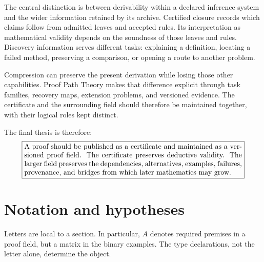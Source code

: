 \documentclass[11pt,oneside]{article}
\theoremstyle{komorebiplain}
\theoremstyle{komorebidefinition}
\theoremstyle{komorebiremark}
\begin{document}
The central distinction is between derivability within a declared inference system and the wider information retained by its archive. Certified closure records which claims follow from admitted leaves and accepted rules. Its interpretation as mathematical validity depends on the soundness of those leaves and rules. Discovery information serves different tasks: explaining a definition, locating a failed method, preserving a comparison, or opening a route to another problem.

Compression can preserve the present derivation while losing those other capabilities. Proof Path Theory makes that difference explicit through task families, recovery maps, extension problems, and versioned evidence. The certificate and the surrounding field should therefore be maintained together, with their logical roles kept distinct.

The final thesis is therefore:
\[
\boxed{\begin{minipage}{0.88\linewidth}
A proof should be published as a certificate and maintained as a versioned proof field. The certificate preserves deductive validity. The larger field preserves the dependencies, alternatives, examples, failures, provenance, and bridges from which later mathematics may grow.
\end{minipage}}
\]


\FloatBarrier
\clearpage
\appendix
{}
\section{Notation and hypotheses}
\label{app:notation}

Letters are local to a section. In particular, $A$ denotes required premises in a proof field, but a matrix in the binary examples. The type declarations, not the letter alone, determine the object.
\end{document}
